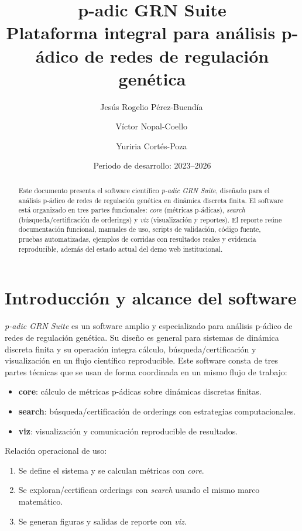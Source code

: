 \documentclass[11pt]{article}
\title{p-adic GRN Suite\\\large Plataforma integral para análisis p-ádico de redes de regulación genética}
\author{
Jesús Rogelio Pérez-Buendía\,\orcidlink{0000-0002-7739-4779}
\and
Víctor Nopal-Coello\,\orcidlink{0000-0003-2608-3636}
\and
Yuriria Cortés-Poza\,\orcidlink{0000-0003-1856-9206}
}
\date{Periodo de desarrollo: 2023--2026}
\begin{document}
\maketitle

\begin{abstract}
Este documento presenta el software científico \emph{p-adic GRN Suite}, diseñado para el análisis p-ádico de redes de regulación genética en dinámica discreta finita. El software está organizado en tres partes funcionales: \textit{core} (métricas p-ádicas), \textit{search} (búsqueda/certificación de orderings) y \textit{viz} (visualización y reportes). El reporte reúne documentación funcional, manuales de uso, scripts de validación, código fuente, pruebas automatizadas, ejemplos de corridas con resultados reales y evidencia reproducible, además del estado actual del demo web institucional.
\end{abstract}

\tableofcontents
\newpage

\section{Introducción y alcance del software}
\emph{p-adic GRN Suite} es un software amplio y especializado para análisis p-ádico de redes de regulación genética. Su diseño es general para sistemas de dinámica discreta finita y su operación integra cálculo, búsqueda/certificación y visualización en un flujo científico reproducible. Este software consta de tres partes técnicas que se usan de forma coordinada en un mismo flujo de trabajo:
\begin{itemize}
  \item \textbf{core}: cálculo de métricas p-ádicas sobre dinámicas discretas finitas.
  \item \textbf{search}: búsqueda/certificación de orderings con estrategias computacionales.
  \item \textbf{viz}: visualización y comunicación reproducible de resultados.
\end{itemize}

Relación operacional de uso:
\begin{enumerate}
  \item Se define el sistema y se calculan métricas con \textit{core}.
  \item Se exploran/certifican orderings con \textit{search} usando el mismo marco matemático.
  \item Se generan figuras y salidas de reporte con \textit{viz}.
\end{enumerate}
\end{document}
